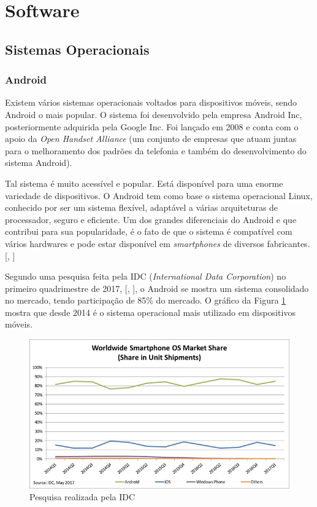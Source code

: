 \documentclass[
	12pt,				%
	oneside,			%
	a4paper,			%
	brazil				%
]{abntex2}
\newcommand{\citecustom}[1]{[\citeauthoronline{#1}, \citeyear{#1}]}
\begin{document}
\newpage

\section{Software}

\subsection{Sistemas Operacionais}

\subsubsection{Android}

Existem vários sistemas operacionais voltados para dispositivos móveis, sendo Android o mais popular. O sistema foi desenvolvido pela empresa Android Inc, posteriormente adquirida pela Google Inc. Foi lançado em 2008 e conta com o apoio da \textit{Open Handset Alliance} (um conjunto de empresas que atuam juntas para o melhoramento dos padrões da telefonia e também do desenvolvimento do sistema Android). 

Tal sistema é muito acessível e popular. Está disponível para uma enorme variedade de dispositivos. O Android tem como base o sistema operacional Linux, conhecido por ser um sistema flexível, adaptável a várias arquiteturas de processador, seguro e eficiente. Um dos grandes diferenciais do Android e que contribui para sua popularidade, é o fato de que o sistema é compatível com vários hardwares e pode estar disponível em \textit{smartphones} de diversos fabricantes. \citecustom{Android}

Segundo uma pesquisa feita pela IDC (\textit{International Data Corporation}) no primeiro quadrimestre de 2017, \citecustom{idc}, o Android se mostra um sistema consolidado no mercado, tendo participação de 85\% do mercado. O gráfico da Figura \ref{idc} mostra que desde 2014 é o sistema operacional mais utilizado em dispositivos móveis.

\begin{figure}[H]
\centering
\includegraphics[width=15cm, center]{images/smartphone-share-market.jpg}
\caption{Pesquisa realizada pela IDC}
\label{idc}
\end{figure}
\end{document}
